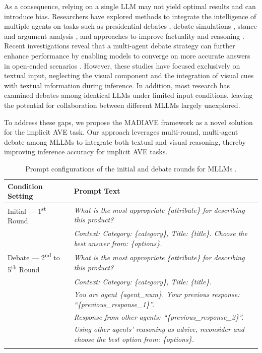 \documentclass[11pt]{article}
\newcommand{\modelname}{MADIAVE}
\begin{document}
As a consequence, relying on a single LLM may not yield optimal results and can introduce bias. Researchers have explored methods to integrate the intelligence of multiple agents on tasks such as presidential debates \citep{liu2024llmpotusscoreframeworkanalyzing}, debate simulations \citep{Taubenfeld_2024}, stance and argument analysis \citep{heinisch-etal-2024-tell}, and approaches to improve factuality and reasoning \citep{du2023improving}. Recent investigations reveal that a multi-agent debate strategy can further enhance performance by enabling models to converge on more accurate answers in open-ended scenarios \citep{chan2023chatevalbetterllmbasedevaluators, khan2024debatingpersuasivellmsleads}. However, these studies have focused exclusively on textual input, neglecting the visual component and the integration of visual cues with textual information during inference. In addition, most research has examined debates among identical LLMs under limited input conditions, leaving the potential for collaboration between different MLLMs largely unexplored.

To address these gaps, we propose the \textsc{\modelname} framework as a novel solution for the implicit AVE task. Our approach leverages multi-round, multi-agent debate among MLLMs to integrate both textual and visual reasoning, thereby improving inference accuracy for implicit AVE tasks.

\begin{table}[ht]
  \centering
  \scriptsize
  \caption{\label{tab:prompt-config}
    Prompt configurations of the initial and debate rounds for MLLMs .}
  \vspace{-0.4em}
  \begin{tabularx}{\textwidth}{L{0.28\textwidth} X}

      \textbf{Condition Setting} 
    & \textbf{Prompt Text} \\
    \midrule
    Initial — 1\textsuperscript{st} Round
    & \emph{What is the most appropriate \{attribute\} for describing this product?}\\
    & \emph{Context: Category: \{category\}, Title: \{title\}. Choose the best answer from: \{options\}.}\\
    \addlinespace[4pt]
    Debate — 2\textsuperscript{nd} to 5\textsuperscript{th} Round
    & \emph{What is the most appropriate \{attribute\} for describing this product?}\\
    & \emph{Context: Category: \{category\}, Title: \{title\}.}\\
    & \emph{You are agent \{agent\_num\}. Your previous response: “\{previous\_response\_1\}”.}\\
    & \emph{Response from other agents: “\{previous\_response\_2\}”.}\\
    & \emph{Using other agents’ reasoning as advice, reconsider and choose the best option from: \{options\}.}\\
    \addlinespace[2pt]
    \bottomrule
  \end{tabularx}
  \vspace{-2mm}
  
\end{table}
\end{document}

